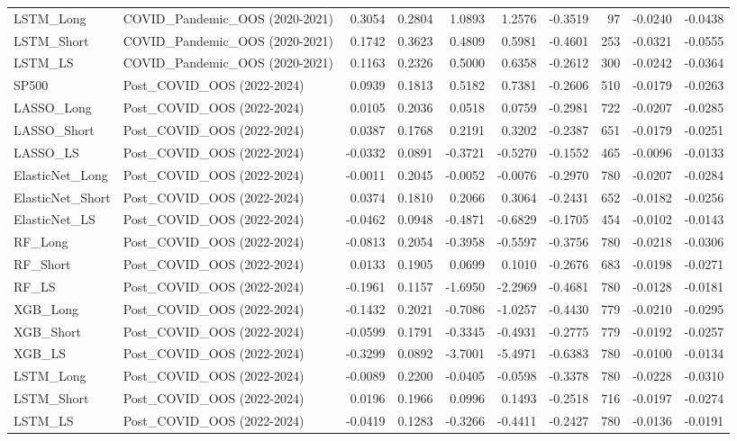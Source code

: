 \begin{tabular}{llrrrrrrrr}
\cline{1-10}
LSTM\_Long & COVID\_Pandemic\_OOS (2020-2021) & 0.3054 & 0.2804 & 1.0893 & 1.2576 & -0.3519 & 97 & -0.0240 & -0.0438 \\
\cline{1-10}
LSTM\_Short & COVID\_Pandemic\_OOS (2020-2021) & 0.1742 & 0.3623 & 0.4809 & 0.5981 & -0.4601 & 253 & -0.0321 & -0.0555 \\
\cline{1-10}
LSTM\_LS & COVID\_Pandemic\_OOS (2020-2021) & 0.1163 & 0.2326 & 0.5000 & 0.6358 & -0.2612 & 300 & -0.0242 & -0.0364 \\
\cline{1-10}
SP500 & Post\_COVID\_OOS (2022-2024) & 0.0939 & 0.1813 & 0.5182 & 0.7381 & -0.2606 & 510 & -0.0179 & -0.0263 \\
\cline{1-10}
LASSO\_Long & Post\_COVID\_OOS (2022-2024) & 0.0105 & 0.2036 & 0.0518 & 0.0759 & -0.2981 & 722 & -0.0207 & -0.0285 \\
\cline{1-10}
LASSO\_Short & Post\_COVID\_OOS (2022-2024) & 0.0387 & 0.1768 & 0.2191 & 0.3202 & -0.2387 & 651 & -0.0179 & -0.0251 \\
\cline{1-10}
LASSO\_LS & Post\_COVID\_OOS (2022-2024) & -0.0332 & 0.0891 & -0.3721 & -0.5270 & -0.1552 & 465 & -0.0096 & -0.0133 \\
\cline{1-10}
ElasticNet\_Long & Post\_COVID\_OOS (2022-2024) & -0.0011 & 0.2045 & -0.0052 & -0.0076 & -0.2970 & 780 & -0.0207 & -0.0284 \\
\cline{1-10}
ElasticNet\_Short & Post\_COVID\_OOS (2022-2024) & 0.0374 & 0.1810 & 0.2066 & 0.3064 & -0.2431 & 652 & -0.0182 & -0.0256 \\
\cline{1-10}
ElasticNet\_LS & Post\_COVID\_OOS (2022-2024) & -0.0462 & 0.0948 & -0.4871 & -0.6829 & -0.1705 & 454 & -0.0102 & -0.0143 \\
\cline{1-10}
RF\_Long & Post\_COVID\_OOS (2022-2024) & -0.0813 & 0.2054 & -0.3958 & -0.5597 & -0.3756 & 780 & -0.0218 & -0.0306 \\
\cline{1-10}
RF\_Short & Post\_COVID\_OOS (2022-2024) & 0.0133 & 0.1905 & 0.0699 & 0.1010 & -0.2676 & 683 & -0.0198 & -0.0271 \\
\cline{1-10}
RF\_LS & Post\_COVID\_OOS (2022-2024) & -0.1961 & 0.1157 & -1.6950 & -2.2969 & -0.4681 & 780 & -0.0128 & -0.0181 \\
\cline{1-10}
XGB\_Long & Post\_COVID\_OOS (2022-2024) & -0.1432 & 0.2021 & -0.7086 & -1.0257 & -0.4430 & 779 & -0.0210 & -0.0295 \\
\cline{1-10}
XGB\_Short & Post\_COVID\_OOS (2022-2024) & -0.0599 & 0.1791 & -0.3345 & -0.4931 & -0.2775 & 779 & -0.0192 & -0.0257 \\
\cline{1-10}
XGB\_LS & Post\_COVID\_OOS (2022-2024) & -0.3299 & 0.0892 & -3.7001 & -5.4971 & -0.6383 & 780 & -0.0100 & -0.0134 \\
\cline{1-10}
LSTM\_Long & Post\_COVID\_OOS (2022-2024) & -0.0089 & 0.2200 & -0.0405 & -0.0598 & -0.3378 & 780 & -0.0228 & -0.0310 \\
\cline{1-10}
LSTM\_Short & Post\_COVID\_OOS (2022-2024) & 0.0196 & 0.1966 & 0.0996 & 0.1493 & -0.2518 & 716 & -0.0197 & -0.0274 \\
\cline{1-10}
LSTM\_LS & Post\_COVID\_OOS (2022-2024) & -0.0419 & 0.1283 & -0.3266 & -0.4411 & -0.2427 & 780 & -0.0136 & -0.0191 \\
\cline{1-10}
\bottomrule
\end{tabular}
